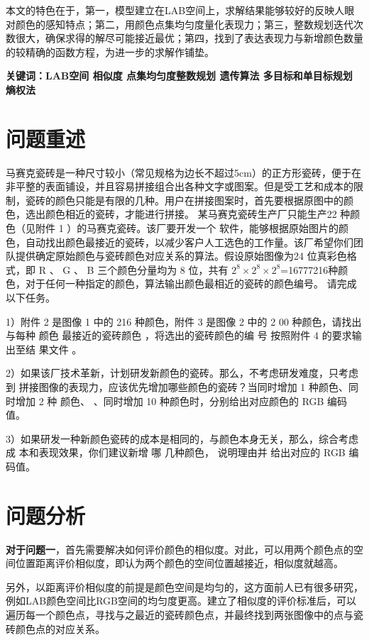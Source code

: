 \documentclass{article}
\begin{document}
	本文的特色在于，第一，模型建立在LAB空间上，求解结果能够较好的反映人眼对颜色的感知特点；第二，用颜色点集均匀度量化表现力；第三，整数规划迭代次数很大，确保求得的解尽可能接近最优；第四，找到了表达表现力与新增颜色数量的较精确的函数方程，为进一步的求解作铺垫。
	\\
	\par
	\noindent\textbf{关键词：\quad LAB空间 \quad 相似度 \quad 点集均匀度\quad 整数规划 \quad 遗传算法 \quad 多目标和单目标规划 \quad 熵权法}
	\newpage
	
	\tableofcontents
	\thispagestyle{empty}
	\newpage
	\setcounter{page}{1}
	\section{问题重述}
	马赛克瓷砖是一种尺寸较小（常见规格为边长不超过5cm）的正方形瓷砖，便于在非平整的表面铺设，并且容易拼接组合出各种文字或图案。但是受工艺和成本的限制，瓷砖的颜色只能是有限的几种。用户在拼接图案时，首先要根据原图中的颜色，选出颜色相近的瓷砖，才能进行拼接。
	某马赛克瓷砖生产厂只能生产22 种颜色（见附件 1 ）的马赛克瓷砖。该厂要开发一个	软件，能够根据原始图片的颜色，自动找出颜色最接近的瓷砖，以减少客户人工选色的工作量。该厂希望你们团队提供确定原始颜色与瓷砖颜色对应关系的算法。假设原始图像为24 位真彩色格式，即 R 、 G 、 B 三个颜色分量均为 8 位，共有 $2^8 \times 2^8\times 2^8$=16777216种颜色，对于任何一种指定的颜色，算法输出颜色最相近的瓷砖的颜色编号。
	请完成以下任务。
	
	1）附件 2 是图像 1 中的 216 种颜色，附件 3 是图像 2 中的 2 00 种颜色，请找出 与每种
	颜色 最接近的瓷砖颜色 ，将选出的瓷砖颜色的编 号 按照附件 4 的要求输出至结 果文件 。
	
	2）如果该厂技术革新，计划研发新颜色的瓷砖。那么，不考虑研发难度，只考虑到
	拼接图像的表现力，应该优先增加哪些颜色的瓷砖？当同时增加 1 种颜色、同时增加 2 种
	颜色、 、同时增加 10 种颜色时，分别给出对应颜色的 RGB 编码值。
	
	3）如果研发一种新颜色瓷砖的成本是相同的，与颜色本身无关，那么，综合考虑成
	本和表现效果，你们建议新增 哪 几种颜色， 说明理由并 给出对应的 RGB 编码值。
	
	\section{问题分析}
	
	\textbf{对于问题一}，首先需要解决如何评价颜色的相似度。对此，可以用两个颜色点的空间位置距离评价相似度，即认为两个颜色的空间位置越接近，相似度就越高。
	
	另外，以距离评价相似度的前提是颜色空间是均匀的，这方面前人已有很多研究，例如LAB颜色空间比RGB空间的均匀度更高。建立了相似度的评价标准后，可以遍历每一个颜色点，寻找与之最近的瓷砖颜色点，并最终找到两张图像中的点与瓷砖颜色点的对应关系。
	
\end{document}
